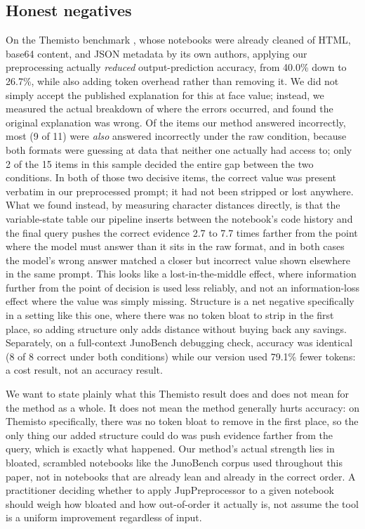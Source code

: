 \documentclass[11pt]{article}
\begin{document}
\subsection{Honest negatives}
\label{sec:honestneg}
On the Themisto benchmark \citep{grotov2025themisto}, whose notebooks
were already cleaned of HTML, base64 content, and JSON metadata by its
own authors, applying our preprocessing actually \emph{reduced}
output-prediction accuracy, from 40.0\% down to 26.7\%, while also adding
token overhead rather than removing it. We did not simply accept the
published explanation for this at face value; instead, we measured the
actual breakdown of where the errors occurred, and found the original
explanation was wrong. Of the items our method answered incorrectly, most
(9 of 11) were \emph{also} answered incorrectly under the raw condition,
because both formats were guessing at data that neither one actually had
access to; only 2 of the 15 items in this sample decided the entire gap
between the two conditions. In both of those two decisive items, the
correct value was present verbatim in our preprocessed prompt; it had not
been stripped or lost anywhere. What we found instead, by measuring
character distances directly, is that the variable-state table our
pipeline inserts between the notebook's code history and the final query
pushes the correct evidence 2.7 to 7.7 times farther from the point where
the model must answer than it sits in the raw format, and in both cases
the model's wrong answer matched a closer but incorrect value shown
elsewhere in the same prompt. This looks like a lost-in-the-middle effect,
where information further from the point of decision is used less
reliably, and not an information-loss effect where the value was simply
missing. Structure is a net negative specifically in a setting like this
one, where there was no token bloat to strip in the first place, so
adding structure only adds distance without buying back any savings.
Separately, on a full-context JunoBench debugging check, accuracy was
identical (8 of 8 correct under both conditions) while our version used
79.1\% fewer tokens: a cost result, not an accuracy result.

We want to state plainly what this Themisto result does and does not
mean for the method as a whole. It does not mean the method generally
hurts accuracy: on Themisto specifically, there was no token bloat to
remove in the first place, so the only thing our added structure could
do was push evidence farther from the query, which is exactly what
happened. Our method's actual strength lies in bloated, scrambled
notebooks like the JunoBench corpus used throughout this paper, not in
notebooks that are already lean and already in the correct order. A
practitioner deciding whether to apply JupPreprocessor to a given
notebook should weigh how bloated and how out-of-order it actually is,
not assume the tool is a uniform improvement regardless of input.
\end{document}
